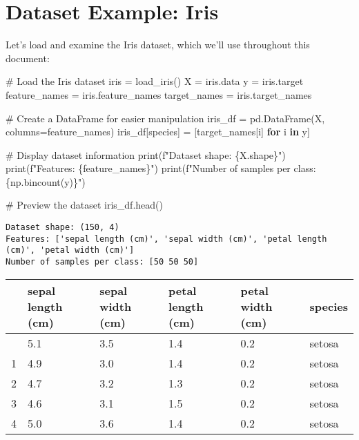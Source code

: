 \documentclass[
  letterpaper,
  DIV=11,
  numbers=noendperiod]{scrreprt}
\newenvironment{Shaded}{\begin{snugshade}}{\end{snugshade}}
\newcommand{\BuiltInTok}[1]{\textcolor[rgb]{0.00,0.23,0.31}{#1}}
\newcommand{\CommentTok}[1]{\textcolor[rgb]{0.37,0.37,0.37}{#1}}
\newcommand{\ControlFlowTok}[1]{\textcolor[rgb]{0.00,0.23,0.31}{\textbf{#1}}}
\newcommand{\KeywordTok}[1]{\textcolor[rgb]{0.00,0.23,0.31}{\textbf{#1}}}
\newcommand{\NormalTok}[1]{\textcolor[rgb]{0.00,0.23,0.31}{#1}}
\newcommand{\OperatorTok}[1]{\textcolor[rgb]{0.37,0.37,0.37}{#1}}
\newcommand{\SpecialCharTok}[1]{\textcolor[rgb]{0.37,0.37,0.37}{#1}}
\newcommand{\SpecialStringTok}[1]{\textcolor[rgb]{0.13,0.47,0.30}{#1}}
\newcommand{\StringTok}[1]{\textcolor[rgb]{0.13,0.47,0.30}{#1}}
\begin{document}
\section{Dataset Example: Iris}\label{dataset-example-iris}

Let's load and examine the Iris dataset, which we'll use throughout this
document:

\begin{Shaded}
\begin{Highlighting}[]
\CommentTok{\# Load the Iris dataset}
\NormalTok{iris }\OperatorTok{=}\NormalTok{ load\_iris()}
\NormalTok{X }\OperatorTok{=}\NormalTok{ iris.data}
\NormalTok{y }\OperatorTok{=}\NormalTok{ iris.target}
\NormalTok{feature\_names }\OperatorTok{=}\NormalTok{ iris.feature\_names}
\NormalTok{target\_names }\OperatorTok{=}\NormalTok{ iris.target\_names}

\CommentTok{\# Create a DataFrame for easier manipulation}
\NormalTok{iris\_df }\OperatorTok{=}\NormalTok{ pd.DataFrame(X, columns}\OperatorTok{=}\NormalTok{feature\_names)}
\NormalTok{iris\_df[}\StringTok{\textquotesingle{}species\textquotesingle{}}\NormalTok{] }\OperatorTok{=}\NormalTok{ [target\_names[i] }\ControlFlowTok{for}\NormalTok{ i }\KeywordTok{in}\NormalTok{ y]}

\CommentTok{\# Display dataset information}
\BuiltInTok{print}\NormalTok{(}\SpecialStringTok{f"Dataset shape: }\SpecialCharTok{\{}\NormalTok{X}\SpecialCharTok{.}\NormalTok{shape}\SpecialCharTok{\}}\SpecialStringTok{"}\NormalTok{)}
\BuiltInTok{print}\NormalTok{(}\SpecialStringTok{f"Features: }\SpecialCharTok{\{}\NormalTok{feature\_names}\SpecialCharTok{\}}\SpecialStringTok{"}\NormalTok{)}
\BuiltInTok{print}\NormalTok{(}\SpecialStringTok{f"Number of samples per class: }\SpecialCharTok{\{}\NormalTok{np}\SpecialCharTok{.}\NormalTok{bincount(y)}\SpecialCharTok{\}}\SpecialStringTok{"}\NormalTok{)}

\CommentTok{\# Preview the dataset}
\NormalTok{iris\_df.head()}
\end{Highlighting}
\end{Shaded}

\begin{verbatim}
Dataset shape: (150, 4)
Features: ['sepal length (cm)', 'sepal width (cm)', 'petal length (cm)', 'petal width (cm)']
Number of samples per class: [50 50 50]
\end{verbatim}

\label{fig-iris-data}
\begin{longtable}[]{@{}llllll@{}}
\toprule\noalign{}
& sepal length (cm) & sepal width (cm) & petal length (cm) & petal width
(cm) & species \\
\midrule\noalign{}
\endhead
\bottomrule\noalign{}
\endlastfoot
0 & 5.1 & 3.5 & 1.4 & 0.2 & setosa \\
1 & 4.9 & 3.0 & 1.4 & 0.2 & setosa \\
2 & 4.7 & 3.2 & 1.3 & 0.2 & setosa \\
3 & 4.6 & 3.1 & 1.5 & 0.2 & setosa \\
4 & 5.0 & 3.6 & 1.4 & 0.2 & setosa \\
\end{longtable}
\end{document}
